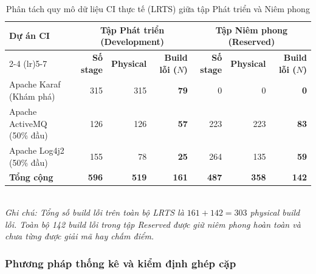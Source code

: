 \begin{table}[H]
\centering
\caption{Phân tách quy mô dữ liệu CI thực tế (LRTS) giữa tập Phát triển và Niêm phong}
\label{tab:lrts_split_stats}
\footnotesize
\setlength{\tabcolsep}{4pt}
\begin{tabular*}{\textwidth}{@{\extracolsep{\fill}}lrrrrrr}
\toprule
\multirow{2}{*}{\textbf{Dự án CI}} & \multicolumn{3}{c}{\textbf{Tập Phát triển (Development)}} & \multicolumn{3}{c}{\textbf{Tập Niêm phong (Reserved)}} \\
\cmidrule(lr){2-4} \cmidrule(lr){5-7}
& \textbf{Số stage} & \textbf{Physical} & \textbf{Build lỗi ($N$)} & \textbf{Số stage} & \textbf{Physical} & \textbf{Build lỗi ($N$)} \\
\midrule
Apache Karaf (Khám phá) & 315 & 315 & \textbf{79} & 0 & 0 & \textbf{0} \\
Apache ActiveMQ (50\% đầu) & 126 & 126 & \textbf{57} & 223 & 223 & \textbf{83} \\
Apache Log4j2 (50\% đầu)  & 155 & 78  & \textbf{25} & 264 & 135 & \textbf{59} \\
\midrule
\textbf{Tổng cộng} & \textbf{596} & \textbf{519} & \textbf{161} & \textbf{487} & \textbf{358} & \textbf{142} \\
\bottomrule
\end{tabular*}
\vspace{1mm}\\
\footnotesize{\textit{Ghi chú: Tổng số build lỗi trên toàn bộ LRTS là $161 + 142 = 303$ physical build lỗi. Toàn bộ 142 build lỗi trong tập Reserved được giữ niêm phong hoàn toàn và chưa từng được giải mã hay chấm điểm.}}
\end{table}

\subsubsection{Phương pháp thống kê và kiểm định ghép cặp}
\label{subsubsec:statistical_methods}

